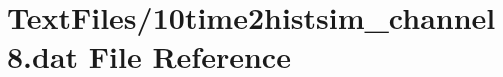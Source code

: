 \hypertarget{10time2histsim__channel8_8dat}{}\section{Text\+Files/10time2histsim\+\_\+channel8.dat File Reference}
\label{10time2histsim__channel8_8dat}
